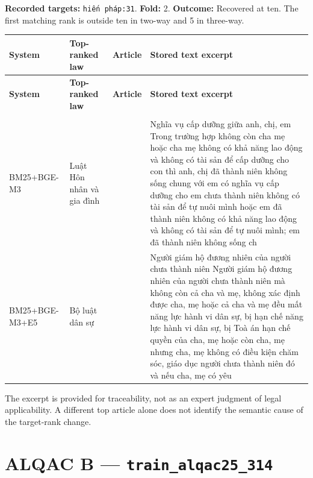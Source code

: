 \textbf{Recorded targets:} \texttt{hiến phá\allowbreak{}p:31}. \textbf{Fold:} 2. \textbf{Outcome:} Recovered at ten. The first matching rank is outside ten in two-way and 5 in three-way.

\begingroup
\scriptsize
\setlength{\tabcolsep}{2pt}
\renewcommand{\arraystretch}{1.0}
\begin{longtable}{>{\raggedright\arraybackslash}p{1.935cm}>{\raggedright\arraybackslash}p{2.585cm}>{\raggedright\arraybackslash}p{1.810cm}>{\raggedright\arraybackslash}p{8.790cm}}
\toprule
\textbf{System} & \textbf{Top-ranked law} & \textbf{Article} & \textbf{Stored text excerpt} \\
\midrule
\endfirsthead
\toprule
\textbf{System} & \textbf{Top-ranked law} & \textbf{Article} & \textbf{Stored text excerpt} \\
\midrule
\endhead
\midrule
\multicolumn{4}{r}{\footnotesize Continued on next page}\\
\endfoot
\bottomrule
\endlastfoot
BM25+\allowbreak{}BGE-M3 & Luật Hôn nhân và gia đình & 112 & Nghĩa vụ cấp dưỡng giữa anh, chị, em     Trong trường hợp không còn cha mẹ hoặc cha mẹ không có khả năng lao động và không có tài sản để cấp dưỡng cho con thì anh, chị đã thành niên không sống chung với em có nghĩa vụ cấp dưỡng cho em chưa thành niên không có tài sản để tự nuôi mình hoặc em đã thành niên không có khả năng lao động và không có tài sản để tự nuôi mình; em đã thành niên không sống ch \\
BM25+\allowbreak{}BGE-M3+\allowbreak{}E5 & Bộ luật dân sự & 70 & Người giám hộ đương nhiên của người chưa thành niên    Người giám hộ đương nhiên của người chưa thành niên mà không còn cả cha và mẹ, không xác định được cha, mẹ hoặc cả cha và mẹ đều mất năng lực hành vi dân sự, bị hạn chế năng lực hành vi dân sự, bị Toà án hạn chế quyền của cha, mẹ hoặc còn cha, mẹ nhưng cha, mẹ không có điều kiện chăm sóc, giáo dục người chưa thành niên đó và nếu cha, mẹ có yêu \\
\end{longtable}
\endgroup

The excerpt is provided for traceability, not as an expert judgment of legal applicability. A different top article alone does not identify the semantic cause of the target-rank change.

\section{ALQAC B — \texttt{train\_al\allowbreak{}qac25\_31\allowbreak{}4}}

